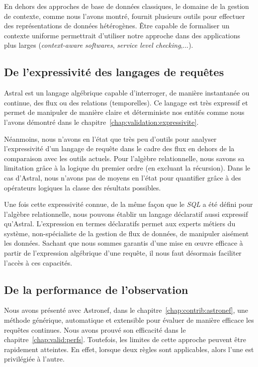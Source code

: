 En dehors des approches de base de données classiques, le domaine de la gestion de contexte, comme nous l'avons montré, fournit plusieurs outils pour effectuer des représentations de données hétérogènes. Être capable de formaliser un contexte uniforme permettrait d'utiliser notre approche dans des applications plus larges (\textit{context-aware softwares}, \textit{service level checking},...).

\subsection{De l'expressivité des langages de requêtes}
Astral est un langage algébrique capable d'interroger, de manière instantanée ou continue, des flux ou des relations (temporelles). Ce langage est très expressif et permet de manipuler de manière claire et déterministe nos entités comme nous l'avons démontré dans le chapitre~\ref{chap:validation:expressivite}.

Néanmoins, nous n'avons en l'état que très peu d'outils pour analyser l'expressivité d'un langage de requête dans le cadre des flux en dehors de la comparaison avec les outils actuels. Pour l'algèbre relationnelle, nous savons sa limitation grâce à la logique du premier ordre (en excluant la récursion). Dans le cas d'Astral, nous n'avons pas de moyens en l'état pour quantifier grâce à des opérateurs logiques la classe des résultats possibles.

Une fois cette expressivité connue, de la même façon que le \textit{SQL} a été défini pour l'algèbre relationnelle, nous pouvons établir un langage déclaratif aussi expressif qu'Astral. L'expression en termes déclaratifs permet aux experts métiers du système, non-spécialiste de la gestion de flux de données, de manipuler aisément les données. Sachant que nous sommes garantis d'une mise en œuvre efficace à partir de l'expression algébrique d'une requête, il nous faut désormais faciliter l'accès à ces capacités.

\subsection{De la performance de l'observation}
Nous avons présenté avec Astronef, dans le chapitre~\ref{chap:contrib:astronef}, une méthode générique, automatique et extensible pour évaluer de manière efficace les requêtes continues. Nous avons prouvé son efficacité dans le chapitre~\ref{chap:valid:perfs}. Toutefois, les limites de cette approche peuvent être rapidement atteintes. En effet, lorsque deux règles sont applicables, alors l'une est privilégiée à l'autre.

